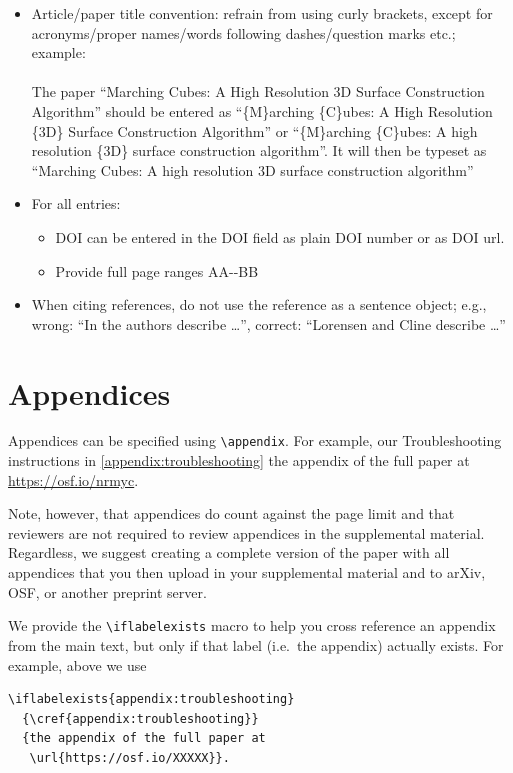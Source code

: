 \documentclass[journal]{vgtc}                %
\begin{document}
\begin{itemize}
  \item Article/paper title convention: refrain from using curly brackets, except for acronyms/proper names/words following dashes/question marks etc.; example:\\\\
        The paper ``Marching Cubes: A High Resolution 3D Surface Construction Algorithm'' should be entered as ``\{M\}arching \{C\}ubes: A High Resolution \{3D\} Surface Construction Algorithm'' or  ``\{M\}arching \{C\}ubes: A high resolution \{3D\} surface construction algorithm''.
        It will then be typeset as ``Marching Cubes: A high resolution 3D surface construction algorithm''
  \item For all entries:
        \begin{itemize}
  	      \item DOI can be entered in the DOI field as plain DOI number or as DOI url.
  	      \item Provide full page ranges AA-{}-BB
        \end{itemize}
  \item When citing references, do not use the reference as a sentence object; e.g., wrong: ``In \cite{Lorensen:1987:MCA} the authors describe \dots'', correct: ``Lorensen and Cline \cite{Lorensen:1987:MCA} describe \dots''
\end{itemize}

\section{Appendices}
\label{sec:appendices_inst}

Appendices can be specified using \verb|\appendix|.
For example, our Troubleshooting instructions in
  {\cref{appendix:troubleshooting}}
  {the appendix of the full paper at \url{https://osf.io/nrmyc}}.


Note, however, that appendices do count against the page limit and that reviewers are not required to review appendices in the supplemental material.
Regardless, we suggest creating a complete version of the paper with all appendices that you then upload in your supplemental material and to arXiv, OSF, or another preprint server.

We provide the \verb|\iflabelexists| macro to help you cross reference an appendix from the main text, but only if that label (i.e.\ the appendix) actually exists.
For example, above we use 

\begin{verbatim}
\iflabelexists{appendix:troubleshooting}
  {\cref{appendix:troubleshooting}}
  {the appendix of the full paper at
   \url{https://osf.io/XXXXX}}.
\end{verbatim}
\end{document}

